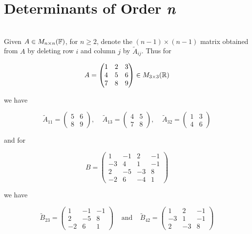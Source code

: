 \section{Determinants of Order \textit{n}}

\begin{notation}
	\hfill\\
	Given $A \in M_{n \times n}(\mathbb{F})$, for $n \geq 2$, denote the $(n-1) \times (n - 1)$ matrix obtained from $A$ by deleting row $i$ and column $j$ by $\tilde{A}_{ij}$. Thus for
	
	\[A = \begin{pmatrix}
		1 & 2 & 3 \\
		4 & 5 & 6 \\
		7 & 8 & 9
	\end{pmatrix} \in M_{3 \times 3}(\mathbb{R})\]
	
	we have
	
	\[\tilde{A}_{11} = \begin{pmatrix}
			5 & 6 \\
			8 & 9
		\end{pmatrix},\ \ \ \ \ 
		\tilde{A}_{13}=\begin{pmatrix}
			4 & 5 \\
			7 & 8
		\end{pmatrix},\ \ \ \ \ 
		\tilde{A}_{32} = \begin{pmatrix}
			1 & 3 \\
			4 & 6
		\end{pmatrix}\]
		
	and for
	
	\[B = \begin{pmatrix}
		1 & -1 & 2 & -1 \\
		-3 & 4 & 1 & -1 \\
		2 & -5 & -3 & 8 \\
		-2 & 6 & -4 & 1
	\end{pmatrix}\]
	
	we have
	
	\[\tilde{B}_{23} = \begin{pmatrix}
		1 & -1 & -1 \\
		2 & -5 & 8 \\
		-2 & 6 & 1
	\end{pmatrix}\ \ \ \ \ \text{and}\ \ \ \ \ \tilde{B}_{42}=\begin{pmatrix}
		1 & 2 & -1 \\
		-3 & 1 & -1 \\
		2 & -3 & 8
	\end{pmatrix}\]
\end{notation}

